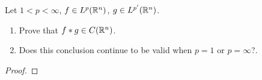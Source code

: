 \begin{problem}
Let $1<p<\infty$, $f\in L^p(\mathbb{R}^n)$, $g\in L^{p'}(\mathbb{R}^n)$.
\begin{enumerate}[label=(\alph*)]
\item Prove that $f*g\in C(\mathbb{R}^n)$.
\item Does this conclusion continue to be valid when $p=1$ or $p=\infty$?.
\end{enumerate}
\end{problem}
\begin{proof}
\end{proof}

